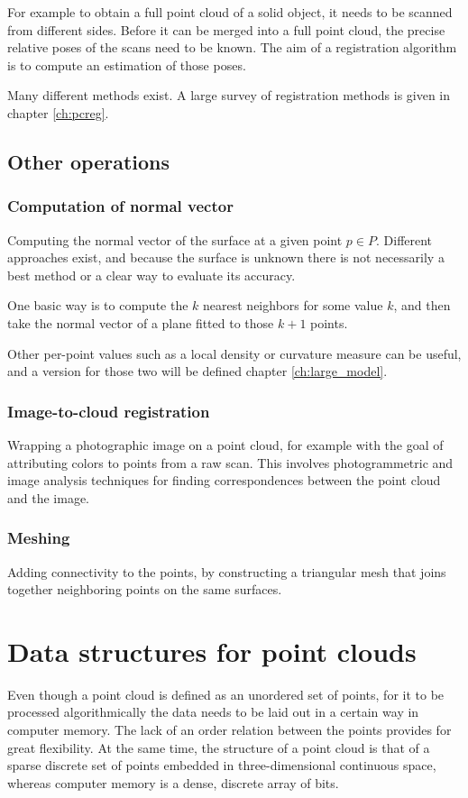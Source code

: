 For example to obtain a full point cloud of a solid object, it needs to be scanned from different sides. Before it can be merged into a full point cloud, the precise relative poses of the scans need to be known. The aim of a registration algorithm is to compute an estimation of those poses.

Many different methods exist. A large survey of registration methods is given in chapter \ref{ch:pcreg}.



\subsection{Other operations}

\subsubsection{Computation of normal vector}
Computing the normal vector of the surface at a given point $p \in P$. Different approaches exist, and because the surface is unknown there is not necessarily a best method or a clear way to evaluate its accuracy.

One basic way is to compute the $k$ nearest neighbors for some value $k$, and then take the normal vector of a plane fitted to those $k + 1$ points. 

Other per-point values such as a local density or curvature measure can be useful, and a version for those two will be defined chapter \ref{ch:large_model}.


\subsubsection{Image-to-cloud registration}
Wrapping a photographic image on a point cloud, for example with the goal of attributing colors to points from a raw scan. This involves photogrammetric and image analysis techniques for finding correspondences between the point cloud and the image.


\subsubsection{Meshing}
Adding connectivity to the points, by constructing a triangular mesh that joins together neighboring points on the same surfaces. 




\section{Data structures for point clouds}
Even though a point cloud is defined as an unordered set of points, for it to be processed algorithmically the data needs to be laid out in a certain way in computer memory. The lack of an order relation between the points provides for great flexibility. At the same time, the structure of a point cloud is that of a sparse discrete set of points embedded in three-dimensional continuous space, whereas computer memory is a dense, discrete array of bits.

